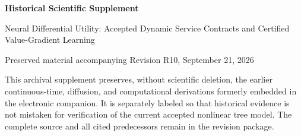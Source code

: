 \documentclass[11pt,letterpaper]{article}
\theoremstyle{definition}
\newcommand{\1}{\mathbf 1}
\begin{document}
\begin{center}{\Large\bfseries Historical Scientific Supplement\par}\medskip
{\large Neural Differential Utility: Accepted Dynamic Service Contracts and Certified Value-Gradient Learning\par}\medskip
Preserved material accompanying Revision R10, September 21, 2026
\end{center}
This archival supplement preserves, without scientific deletion, the earlier continuous-time, diffusion, and computational derivations formerly embedded in the electronic companion. It is separately labeled so that historical evidence is not mistaken for verification of the current accepted nonlinear tree model. The complete source and all cited predecessors remain in the revision package.






\clearpage

\clearpage

\end{document}
